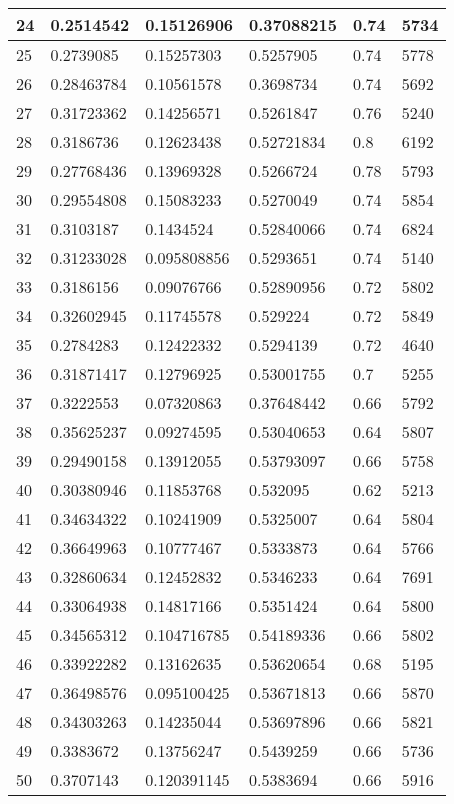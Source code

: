 \begin{longtable}{|l|l|l|l|l|l|}
24 & 0.2514542 & 0.15126906 & 0.37088215 & 0.74 & 5734 \\ \hline 
25 & 0.2739085 & 0.15257303 & 0.5257905 & 0.74 & 5778 \\ \hline 
26 & 0.28463784 & 0.10561578 & 0.3698734 & 0.74 & 5692 \\ \hline 
27 & 0.31723362 & 0.14256571 & 0.5261847 & 0.76 & 5240 \\ \hline 
28 & 0.3186736 & 0.12623438 & 0.52721834 & 0.8 & 6192 \\ \hline 
29 & 0.27768436 & 0.13969328 & 0.5266724 & 0.78 & 5793 \\ \hline 
30 & 0.29554808 & 0.15083233 & 0.5270049 & 0.74 & 5854 \\ \hline 
31 & 0.3103187 & 0.1434524 & 0.52840066 & 0.74 & 6824 \\ \hline 
32 & 0.31233028 & 0.095808856 & 0.5293651 & 0.74 & 5140 \\ \hline 
33 & 0.3186156 & 0.09076766 & 0.52890956 & 0.72 & 5802 \\ \hline 
34 & 0.32602945 & 0.11745578 & 0.529224 & 0.72 & 5849 \\ \hline 
35 & 0.2784283 & 0.12422332 & 0.5294139 & 0.72 & 4640 \\ \hline 
36 & 0.31871417 & 0.12796925 & 0.53001755 & 0.7 & 5255 \\ \hline 
37 & 0.3222553 & 0.07320863 & 0.37648442 & 0.66 & 5792 \\ \hline 
38 & 0.35625237 & 0.09274595 & 0.53040653 & 0.64 & 5807 \\ \hline 
39 & 0.29490158 & 0.13912055 & 0.53793097 & 0.66 & 5758 \\ \hline 
40 & 0.30380946 & 0.11853768 & 0.532095 & 0.62 & 5213 \\ \hline 
41 & 0.34634322 & 0.10241909 & 0.5325007 & 0.64 & 5804 \\ \hline 
42 & 0.36649963 & 0.10777467 & 0.5333873 & 0.64 & 5766 \\ \hline 
43 & 0.32860634 & 0.12452832 & 0.5346233 & 0.64 & 7691 \\ \hline 
44 & 0.33064938 & 0.14817166 & 0.5351424 & 0.64 & 5800 \\ \hline 
45 & 0.34565312 & 0.104716785 & 0.54189336 & 0.66 & 5802 \\ \hline 
46 & 0.33922282 & 0.13162635 & 0.53620654 & 0.68 & 5195 \\ \hline 
47 & 0.36498576 & 0.095100425 & 0.53671813 & 0.66 & 5870 \\ \hline 
48 & 0.34303263 & 0.14235044 & 0.53697896 & 0.66 & 5821 \\ \hline 
49 & 0.3383672 & 0.13756247 & 0.5439259 & 0.66 & 5736 \\ \hline 
50 & 0.3707143 & 0.120391145 & 0.5383694 & 0.66 & 5916 \\ \hline 
\end{longtable}
